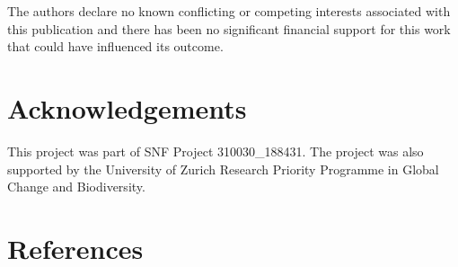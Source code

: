 \documentclass[]{elsarticle} %
\begin{document}
The authors declare no known conflicting or competing interests
associated with this publication and there has been no significant
financial support for this work that could have influenced its outcome.

\hypertarget{acknowledgements}{%
\section{Acknowledgements}\label{acknowledgements}}

This project was part of SNF Project 310030\_188431. The project was
also supported by the University of Zurich Research Priority Programme
in Global Change and Biodiversity.

\hypertarget{references}{%
\section*{References}\label{references}}
\end{document}
